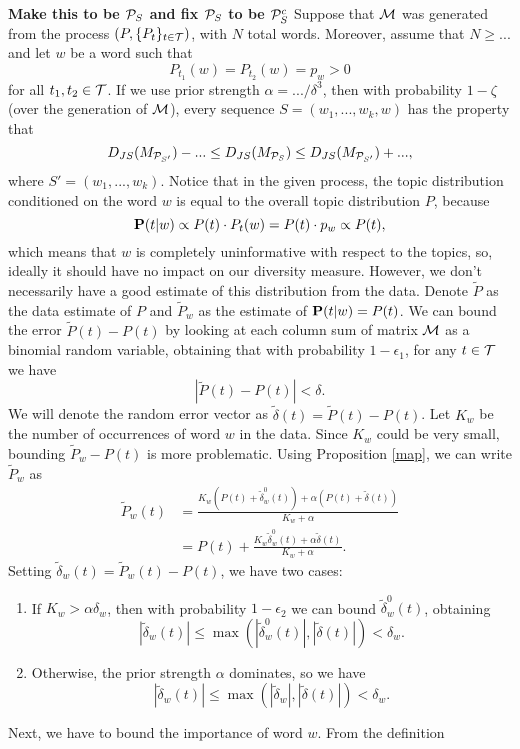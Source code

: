 {\bf Make this to be ${\mathcal P}_S$ and fix ${\mathcal P}_S$ to be ${\mathcal P}_S^c$}
\bep
Suppose that ${\mathcal M}$ was generated from the process
$(P,\{P_t\}_{t\in {\mathcal T}})$, with $N$ total words. Moreover,
assume that $N\geq ...$ and let 
$w$ be a word such that \[P_{t_1}(w)=P_{t_2}(w)=p_w>0\] for all
$t_1,t_2\in {\mathcal T}$. If we use prior strength $\alpha = .../\delta^3$, then with
probability $1-\zeta$ (over the generation of ${\mathcal M}$), every
sequence $S=(w_1,...,w_k,w)$ has the property that 
\[D_{JS}(M_{{\mathcal P}_{S'}})-...\leq D_{JS}(M_{{\mathcal P}_S})\leq
D_{JS}(M_{{\mathcal P}_{S'}})+...,\]
where $S' = (w_1,...,w_k)$.
\eep
\proof
Notice that in the given process, the topic distribution conditioned
on the word $w$ is equal to the overall topic distribution $P$,
because
\[\operatorname{\mathbf{P}}(t|w) \propto P(t)\cdot P_t(w)=P(t)\cdot p_w\propto P(t),\]
which means that $w$ is completely uninformative with respect to the
topics, so, ideally it should have no impact on our diversity measure.
However, we don't necessarily have a good estimate of this
distribution from the data. Denote $\tilde{P}$ as the data estimate of
$P$ and $\tilde{P}_w$ as the estimate of $\operatorname{\mathbf{P}}(t|w)=P(t)$. We can
bound the error $\tilde{P}(t)-P(t)$ by looking at each column sum of
matrix ${\mathcal M}$ as a binomial random variable, obtaining that with
probability $1-\epsilon_1$, for any $t\in {\mathcal T}$ we have 
\[|\tilde{P}(t)-P(t)| < \delta.\]
We will denote the random error vector as
$\tilde{\delta}(t)=\tilde{P}(t)-P(t)$. 
Let $K_w$ be the number of
occurrences of word $w$ in the data.
Since $K_w$ could be very small, bounding $\tilde{P}_w-P(t)$ is more
problematic. Using Proposition \ref{map}, we can write $\tilde{P}_w$ as
\begin{align*}
\tilde{P}_w(t) &= \frac{K_w(P(t)+\tilde{\delta}_w^0(t)) +
\alpha(P(t)+\tilde{\delta}(t))}{K_w+\alpha} \\
&= P(t) + \frac{K_w\tilde{\delta}_w^0(t) + \alpha \tilde{\delta}(t)}{K_w + \alpha}. 
\end{align*}
Setting $\tilde{\delta}_w(t)=\tilde{P}_w(t)-P(t)$, we have two cases:
\begin{enumerate}
\item If $K_w>\alpha\delta_w$, then with probability $1-\epsilon_2$ we can bound
$\tilde{\delta}_w^0(t)$, obtaining
\[|\tilde{\delta}_w(t)|\leq\max(|\tilde{\delta}_w^0(t)|,|\tilde{\delta}(t)|)
< \delta_w.\] 
\item Otherwise, the prior strength $\alpha$ dominates, so we have
\[|\tilde{\delta}_w(t)|\leq\max(|\tilde{\delta}_w|,|\tilde{\delta}(t)|) < \delta_w.\]
\end{enumerate}
Next, we have to bound the importance of word $w$. From the definition
